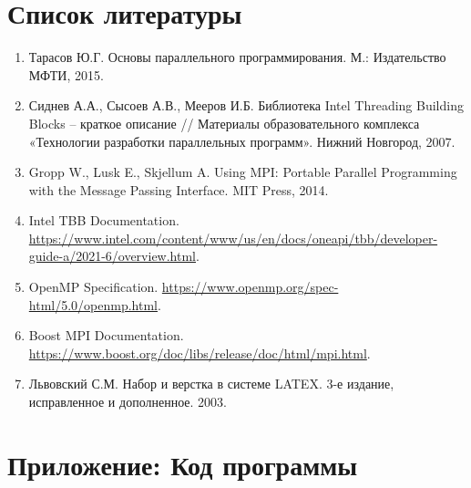 \documentclass[a4paper,12pt]{article}
\begin{document}
\section*{Список литературы}
\begin{enumerate}
    \item Тарасов Ю.Г. Основы параллельного программирования. М.: Издательство МФТИ, 2015.
    \item Сиднев А.А., Сысоев А.В., Мееров И.Б. Библиотека Intel Threading Building Blocks – краткое описание // Материалы образовательного комплекса «Технологии разработки параллельных программ». Нижний Новгород, 2007.
    \item Gropp W., Lusk E., Skjellum A. Using MPI: Portable Parallel Programming with the Message Passing Interface. MIT Press, 2014.
    \item Intel TBB Documentation. \url{https://www.intel.com/content/www/us/en/docs/oneapi/tbb/developer-guide-a/2021-6/overview.html}.
    \item OpenMP Specification. \url{https://www.openmp.org/spec-html/5.0/openmp.html}.
    \item Boost MPI Documentation. \url{https://www.boost.org/doc/libs/release/doc/html/mpi.html}.
    \item Львовский С.М. Набор и верстка в системе LATEX. 3-е издание, исправленное и дополненное. 2003.
\end{enumerate}


\section*{Приложение: Код программы}
\end{document}
